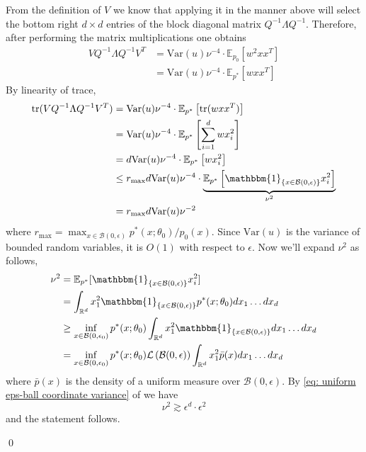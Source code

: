 \documentclass[11pt]{article}
\begin{document}
From the definition of $V$ we know that applying it in the manner above will select the bottom right $d\times d$ entries of the block diagonal matrix $Q^{-1}\Lambda Q^{-1}$. Therefore, after performing the matrix multiplications one obtains
\begin{align}
    VQ^{-1}\Lambda Q^{-1}V^T&= \text{Var}(u)\nu^{-4} \cdot \mathbb{E}_{p_0}\left[w^2xx^T\right] \\
    &= \text{Var}(u)\nu^{-4} \cdot \mathbb{E}_{p^*}\left[wxx^T\right]
\end{align}
By linearity of trace,
\begin{align}
    \text{tr}(VQ^{-1}\Lambda Q^{-1}V^T) &= \text{Var}(u)\nu^{-4} \cdot \mathbb{E}_{p^*}\left[\text{tr}(wxx^T)\right] \\
    &= \text{Var}(u)\nu^{-4} \cdot \mathbb{E}_{p^*}\left[\sum_{i = 1}^dwx_i^2\right] \\
    &= d\text{Var}(u)\nu^{-4} \cdot \mathbb{E}_{p^*}\left[wx_i^2\right] \\
    &\leq r_{\max}d\text{Var}(u)\nu^{-4} \cdot \underbrace{\mathbb{E}_{p^*}\left[\mathbbm{1}_{\{x \in \mathcal{B}(0, \epsilon)\}}x_i^2\right]}_{\nu^2} \\
    &= r_{\max}d\text{Var}(u)\nu^{-2}
\end{align}
where $r_{\max} = \max_{x\in \mathcal{B}(0, \epsilon)}p^*(x;\theta_0)/p_0(x).$ Since $\text{Var}(u)$ is the variance of bounded random variables, it is $O(1)$ with respect to $\epsilon$. Now we'll expand $\nu^{2}$ as follows,
\begin{align}
    \nu^2 &= \mathbb{E}_{p^*}[\mathbbm{1}_{\{x \in \mathcal{B}(0, \epsilon)\}}x_i^2] \\
    &= \int_{\mathbb{R}^d}x_1^2\mathbbm{1}_{\{x \in \mathcal{B}(0, \epsilon)\}}p^*(x;\theta_0)dx_1\dots dx_d \\
    &\geq \inf_{x \in \mathcal{B}(0,\epsilon_0)}p^*(x;\theta_0) \int_{\mathbb{R}^d}x_1^2\mathbbm{1}_{\{x \in \mathcal{B}(0, \epsilon)\}}dx_1\dots dx_d \\
    &= \inf_{x \in \mathcal{B}(0,\epsilon_0)}p^*(x;\theta_0) \mathcal{L}\left(\mathcal{B}(0,\epsilon)\right) \int_{\mathbb{R}^d}x_1^2\bar{p}(x)dx_1\dots dx_d
\end{align}
where $\bar{p}(x)$ is the density of a uniform measure over $\mathcal{B}(0,\epsilon)$. By \cref{eq: uniform eps-ball coordinate variance} of  we have 
\[\nu^2 \gtrsim \epsilon^d \cdot \epsilon^2 \]
and the statement follows. 

\qed{}
\end{document}
